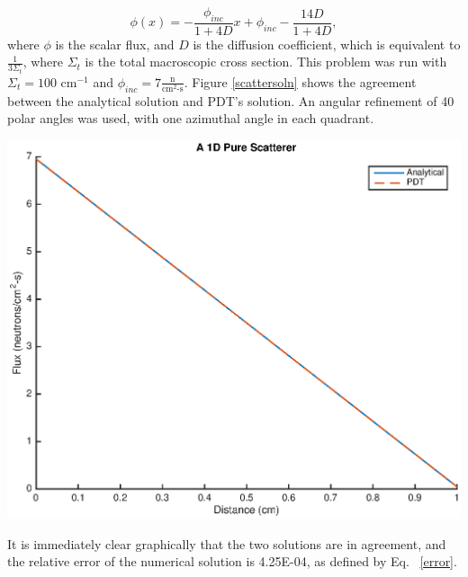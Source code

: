 \begin{equation}
\phi(x) = -\frac{\phi_{inc}}{1+ 4D}x + \phi_{inc} - \frac{14D}{1+ 4D},
\label{scatterflux}
\end{equation}
where $\phi$ is the scalar flux, and $D$ is the diffusion coefficient, which is equivalent to $\frac{1}{3 \Sigma_t}$, where $\Sigma_t$ is the total macroscopic cross section. This problem was run with $\Sigma_t = 100 \text{ cm}^{-1}$ and $\phi_{inc} = 7 \frac{\text{n}}{\text{cm}^2\text{-s}}$. Figure \ref{scattersoln} shows the agreement between the analytical solution and PDT's solution. An angular refinement of 40 polar angles was used, with one azimuthal angle in each quadrant.

\noindent\begin{minipage}{\textwidth}
\centering
\includegraphics[scale = 0.8]{figures/PureScatterer.eps}
\label{scattersoln}
\end{minipage}
\smallskip

It is immediately clear graphically that the two solutions are in agreement, and the relative error of the numerical solution is 4.25E-04, as defined by Eq. ~\eqref{error}.


